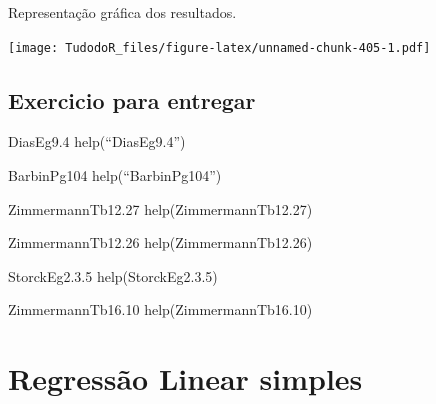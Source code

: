 \documentclass[
]{book}
\newenvironment{Shaded}{\begin{snugshade}}{\end{snugshade}}
\newcommand{\DataTypeTok}[1]{\textcolor[rgb]{0.13,0.29,0.53}{#1}}
\newcommand{\DecValTok}[1]{\textcolor[rgb]{0.00,0.00,0.81}{#1}}
\newcommand{\FloatTok}[1]{\textcolor[rgb]{0.00,0.00,0.81}{#1}}
\newcommand{\KeywordTok}[1]{\textcolor[rgb]{0.13,0.29,0.53}{\textbf{#1}}}
\newcommand{\NormalTok}[1]{#1}
\newcommand{\OperatorTok}[1]{\textcolor[rgb]{0.81,0.36,0.00}{\textbf{#1}}}
\newcommand{\StringTok}[1]{\textcolor[rgb]{0.31,0.60,0.02}{#1}}
\begin{document}
Representação gráfica dos resultados.

\begin{Shaded}
\end{Shaded}

\texttt{[image: TudodoR\_files/figure-latex/unnamed-chunk-405-1.pdf]}

\hypertarget{exercicio-para-entregar}{%
\subsection{Exercicio para entregar}\label{exercicio-para-entregar}}

DiasEg9.4
help(``DiasEg9.4'')

BarbinPg104
help(``BarbinPg104'')

ZimmermannTb12.27
help(ZimmermannTb12.27)

ZimmermannTb12.26
help(ZimmermannTb12.26)

StorckEg2.3.5
help(StorckEg2.3.5)

ZimmermannTb16.10
help(ZimmermannTb16.10)

\hypertarget{regressuxe3o-linear-simples}{%
\section{Regressão Linear simples}\label{regressuxe3o-linear-simples}}
\end{document}
